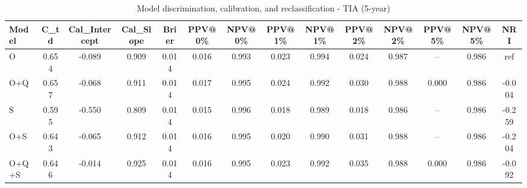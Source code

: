 \begin{table}[htbp]
\centering
\small
\caption{Model discrimination, calibration, and reclassification - TIA (5-year)}
\label{tab:perf_tia_5y}
\begin{tabular}{lccccccccccccc}
\toprule
Model & C\_td & Cal\_Intercept & Cal\_Slope & Brier & PPV@0\% & NPV@0\% & PPV@1\% & NPV@1\% & PPV@2\% & NPV@2\% & PPV@5\% & NPV@5\% & NRI \\
\midrule
O & 0.654 & -0.089 & 0.909 & 0.014 & 0.016 & 0.993 & 0.023 & 0.994 & 0.024 & 0.987 & -- & 0.986 & ref \\
O+Q & 0.657 & -0.068 & 0.911 & 0.014 & 0.017 & 0.995 & 0.024 & 0.992 & 0.030 & 0.988 & 0.000 & 0.986 & -0.004 \\
S & 0.595 & -0.550 & 0.809 & 0.014 & 0.015 & 0.996 & 0.018 & 0.989 & 0.018 & 0.986 & -- & 0.986 & -0.259 \\
O+S & 0.643 & -0.065 & 0.912 & 0.014 & 0.016 & 0.995 & 0.020 & 0.990 & 0.031 & 0.988 & -- & 0.986 & -0.204 \\
O+Q+S & 0.646 & -0.014 & 0.925 & 0.014 & 0.016 & 0.995 & 0.023 & 0.992 & 0.035 & 0.988 & 0.000 & 0.986 & -0.092 \\
\bottomrule
\end{tabular}
\end{table}